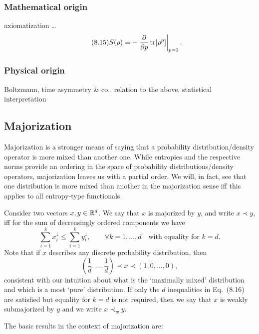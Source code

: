 \documentclass[11pt,a4paper]{article}
\theoremstyle{plain}
\theoremstyle{definition}
\theoremstyle{remark}
\begin{document}
\subsubsection{Mathematical origin}

axiomatization \ldots
\begin{equation}\tag{8.15}
    S(\rho) = -\left.\frac{\partial}{\partial p}\operatorname{tr}[\rho^p]\right|_{p=1}.
\end{equation}

\subsubsection{Physical origin}

Boltzmann, time asymmetry \& co., relation to the above, statistical interpretation

\subsection{Majorization}

Majorization is a stronger means of saying that a probability distribution/density operator is more mixed than another one. While entropies and the respective norms
provide an ordering in the space of probability distributions/density operators, majorization leaves us with a partial order. We will, in fact, see that one distribution
is more mixed than another in the majorization sense iff this applies to all entropy-type functionals.

Consider two vectors $x,y\in\mathbb{R}^d$. We say that $x$ is majorized by $y$, and write $x\prec y$, iff for the sum of decreasingly ordered components we have
\begin{equation}\tag{8.16}
    \sum_{i=1}^k x_i^{\downarrow} \le \sum_{i=1}^k y_i^{\downarrow},
    \qquad \forall k=1,\dots,d
    \quad\text{with equality for } k=d.
\end{equation}
Note that if $x$ describes any discrete probability distribution, then
\begin{equation}\tag{8.17}
    \left(\frac{1}{d},\dots,\frac{1}{d}\right)\prec x \prec (1,0,\dots,0),
\end{equation}
consistent with our intuition about what is the `maximally mixed' distribution and which is a most `pure' distribution. If only the $d$ inequalities in Eq.~(8.16) are satisfied
but equality for $k=d$ is not required, then we say that $x$ is weakly submajorized by $y$ and we write $x\prec_w y$.

The basic results in the context of majorization are:
\end{document}
